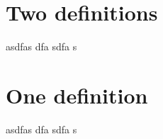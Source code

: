 \documentclass{report}
\newcommand{\ExampleList}{
  \hypertarget{listOfExamples}{}
  \listofExampleMacro
}
\begin{document}
\section{Two definitions}

\begin{example}[12312]
  asdfas dfa sdfa s
\end{example}

\section{One definition}


\begin{example}[sfdsadf]
  asdfas dfa sdfa s
\end{example}

\ExampleList
\end{document}
